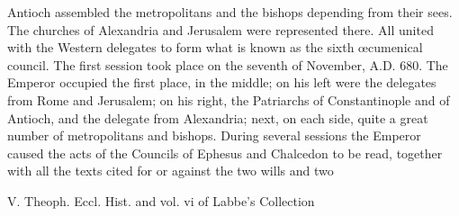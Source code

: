 Antioch assembled the metropolitans and the bishops depending from their sees. The churches of Alexandria and Jerusalem were represented there. All united with the Western delegates to form what is known as the sixth œcumenical council. The first session took place on the seventh of November, A.D. 680. The Emperor occupied the first place, in the middle; on his left were the delegates from Rome and Jerusalem; on his right, the Patriarchs of Constantinople and of Antioch, and the delegate from Alexandria; next, on each side, quite a great number of metropolitans and bishops. During several sessions the Emperor caused the acts of the Councils of Ephesus and Chalcedon to be read, together with all the texts cited for or against the two wills and two

V. Theoph. Eccl. Hist. and vol. vi of Labbe’s Collection

